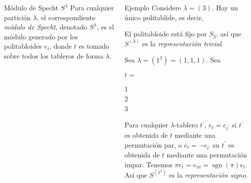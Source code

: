 \documentclass[final,xcolor=svgnames]{beamer}
\DeclareMathOperator{\sgn}{sgn}
\begin{document}
\begin{frame}{}
\begin{columns}
\begin{column}{0.5\textwidth}
      \begin{block}{Módulo de Specht $S^{\lambda}$}
          Para cualquier partición $\lambda$, el correspondiente
          \textit{módulo de Specht}, denotado $S^{\lambda}$, es el
          módulo generado por los politabloides $e_{t}$, donde $t$ es tomado sobre todos los tableros de forma $\lambda$.
      \end{block}     
    \end{column}

    \begin{column}{0.5\textwidth}
      
      \begin{block}{Ejemplo}
            Considere $\lambda=(3)$. Hay un único politablide, es decir,
            \begin{center}
            \end{center}
            El politabloide está fijo por $S_{3}$, así que $S^{(3)}$ es la
            \textit{representación trivial}.
        
            Sea $\lambda=(1^{3})=(1,1,1)$. Sea
            \begin{center}$t=$
              \begin{ytableau}
                1\\
                2\\
                3
              \end{ytableau}
            \end{center}
            Para cualquier $\lambda$-tablero $t^{'}$,
            $e_{t}=e_{t^{'}}$ si $t^{'}$ es obtenida de $t$ mediante
            una permutación par, o $e_{t}=-e_{t^{'}}$ su $t^{'}$ es
            obtenida de $t$ mediante una permutación impar. Tenemos $\pi
            e_{t}=e_{\pi t}=\sgn(\pi)e_{t}$. Así que $S^{(1^{3})}$ es la
            \textit{representación signo}.
         

\end{block}
\end{column}
\end{columns}
\end{frame}
\end{document}
